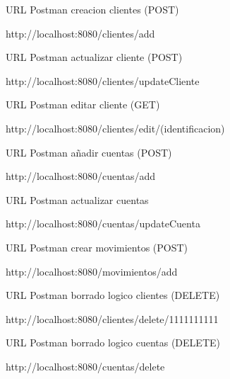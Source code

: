 URL Postman creacion clientes  (POST)

http://localhost:8080/clientes/add


URL Postman actualizar cliente  (POST)

http://localhost:8080/clientes/updateCliente

URL Postman editar cliente (GET)

http://localhost:8080/clientes/edit/(identificacion)


URL Postman añadir cuentas  (POST)

http://localhost:8080/cuentas/add

URL Postman actualizar cuentas

http://localhost:8080/cuentas/updateCuenta

URL Postman crear movimientos (POST)

http://localhost:8080/movimientos/add


URL Postman borrado logico clientes (DELETE)

http://localhost:8080/clientes/delete/1111111111

URL Postman borrado logico cuentas (DELETE)

http://localhost:8080/cuentas/delete


 